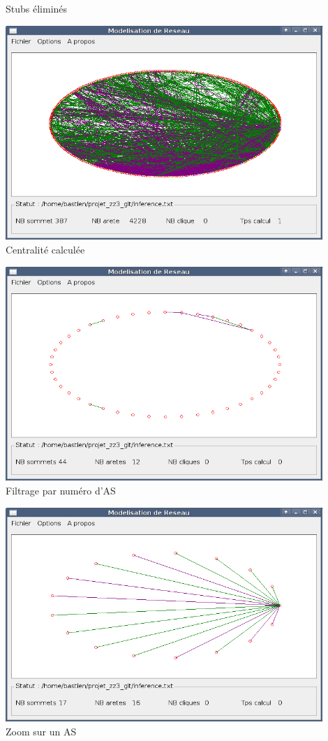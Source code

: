 {{\begin{center}
   Stubs \'elimin\'es
   \end{center}
}
{
   \begin{center}
   \includegraphics[width=0.9\textwidth]{ecran_graphe_centrality.png}\\
   Centralit\'e calcul\'ee
   \end{center}
}
{
   \begin{center}
   \includegraphics[width=0.9\textwidth]{ecran_graphe_filtre.png}\\
   Filtrage par num\'ero d'AS
   \end{center}
}
{
   \begin{center}
   \includegraphics[width=0.9\textwidth]{ecran_graphe_zoom.png}\\
   Zoom sur un AS
   \end{center}
}
}